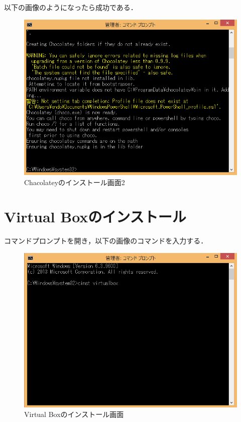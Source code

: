\newpage

以下の画像のようになったら成功である．

\begin{figure}[htb]
\centering
\includegraphics[width=15cm]{choco-cmd2.png}
\caption{Chacolateyのインストール画面2}\label{chocoinst2}
\end{figure}

\newpage

\section{Virtual Boxのインストール}
コマンドプロンプトを開き，以下の画像のコマンドを入力する．

\begin{figure}[htb]
\centering
\includegraphics[width=15cm]{vb-cmd1.png}
\caption{Virtual Boxのインストール画面}\label{vbinst1}
\end{figure}


